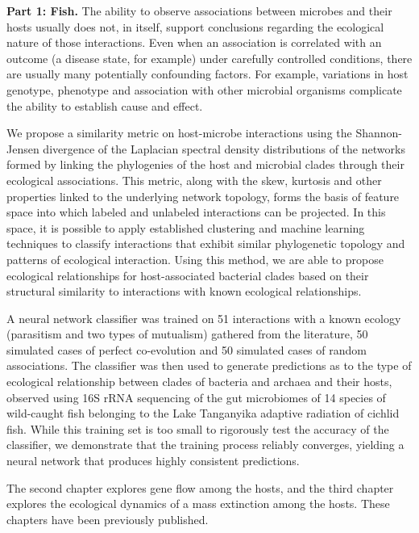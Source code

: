 
\noindent\textbf{Part 1: Fish.}
The ability to observe associations between microbes and their hosts usually does not, in itself, support conclusions regarding the ecological nature of those interactions. Even when an association is correlated with an outcome (a disease state, for example) under carefully controlled conditions, there are usually many potentially confounding factors. For example, variations in host genotype, phenotype and association with other microbial organisms complicate the ability to establish cause and effect.

We propose a similarity metric on host-microbe interactions using the Shannon-Jensen divergence of the Laplacian spectral density distributions of the networks formed by linking the phylogenies of the host and microbial clades through their ecological associations. This metric, along with the skew, kurtosis and other properties linked to the underlying network topology, forms the basis of feature space into which labeled and unlabeled interactions can be projected. In this space, it is possible to apply established clustering and machine learning techniques to classify interactions that exhibit similar phylogenetic topology and patterns of ecological interaction. Using this method, we are able to propose ecological relationships for host-associated bacterial clades based on their structural similarity to interactions with known ecological relationships.

A neural network classifier was trained on 51 interactions with a known ecology (parasitism and two types of mutualism) gathered from the literature, 50 simulated cases of perfect co-evolution and 50 simulated cases of random associations. The classifier was then used to generate predictions as to the type of ecological relationship between clades of bacteria and archaea and their hosts, observed using 16S rRNA sequencing of the gut microbiomes of 14 species of wild-caught fish belonging to the Lake Tanganyika adaptive radiation of cichlid fish. While this training set is too small to rigorously test the accuracy of the classifier, we demonstrate that the training process reliably converges, yielding a neural network that produces highly consistent predictions. 

The second chapter explores gene flow among the hosts, \cite{mcgee2016evaluating} and the third chapter explores the ecological dynamics of a mass extinction among the hosts. \cite{mcgee2015pharyngeal} These chapters have been previously published. 

